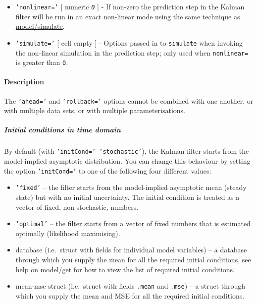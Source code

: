  \begin{itemize}
 \item
   \texttt{'nonlinear='} {[} numeric \textbar{} \emph{\texttt{0}} {]} -
   If non-zero the prediction step in the Kalman filter will be run in an
   exact non-linear mode using the same technique as
   \url{model/simulate}.
 \item
   \texttt{'simulate='} {[} cell \textbar{} empty {]} - Options passed in
   to \texttt{simulate} when invoking the non-linear simulation in the
   prediction step; only used when \texttt{nonlinear=} is greater than
   \texttt{0}.
 \end{itemize}
 
 \paragraph{Description}
 
 The \texttt{'ahead='} and \texttt{'rollback='} options cannot be
 combined with one another, or with multiple data sets, or with multiple
 parameterisations.
 
 \subparagraph{Initial conditions in time domain}
 
 By default (with \texttt{'initCond=' 'stochastic'}), the Kalman filter
 starts from the model-implied asymptotic distribution. You can change
 this behaviour by setting the option \texttt{'initCond='} to one of the
 following four different values:
 
 \begin{itemize}
 \item
   \texttt{'fixed'} -- the filter starts from the model-implied
   asymptotic mean (steady state) but with no initial uncertainty. The
   initial condition is treated as a vector of fixed, non-stochastic,
   numbers.
 \item
   \texttt{'optimal'} -- the filter starts from a vector of fixed numbers
   that is estimated optimally (likelihood maximising).
 \item
   database (i.e.~struct with fields for individual model variables) -- a
   database through which you supply the mean for all the required
   initial conditions, see help on \url{model/get} for how to view the
   list of required initial conditions.
 \item
   mean-mse struct (i.e.~struct with fields \texttt{.mean} and
   \texttt{.mse}) -- a struct through which you supply the mean and MSE
   for all the required initial conditions.
 \end{itemize}
 
